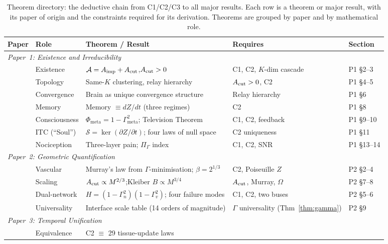 \documentclass[aps,pre,twocolumn,superscriptaddress,floatfix]{revtex4-2}
\begin{document}
\begin{table}[t]
\caption{Theorem directory: the deductive chain from
C1/C2/C3 to all major results.
Each row is a theorem or major result, with its paper
of origin and the constraints required for its derivation.
Theorems are grouped by paper and by mathematical role.}
\label{tab:directory}
\begin{ruledtabular}
\begin{tabular}{lllll}
\textbf{Paper} & \textbf{Role} & \textbf{Theorem / Result}
  & \textbf{Requires} & \textbf{Section} \\
\hline
\multicolumn{5}{l}{\textit{Paper~1: Existence and
Irreducibility}} \\
& Existence &
  $\mathcal{A} = A_{\text{imp}} + A_{\text{cut}}$,\;$A_{\text{cut}} > 0$
  & C1, C2, $K$-dim cascade
  & P1 \S2--3 \\
& Topology &
  Same-$K$ clustering, relay hierarchy
  & $A_{\text{cut}} > 0$, C2
  & P1 \S4--5 \\
& Convergence &
  Brain as unique convergence structure
  & Relay hierarchy
  & P1 \S6 \\
& Memory &
  Memory $\equiv dZ/dt$ (three regimes)
  & C2
  & P1 \S8 \\
& Consciousness &
  $\Phi_{\text{meta}} = 1 - \Gamma_{\text{meta}}^2$;
  Television Theorem
  & C1, C2, feedback
  & P1 \S9--10 \\
& ITC (``Soul'') &
  $\mathcal{S} = \ker(\partial Z/\partial t)$;
  four laws of null space
  & C2 uniqueness
  & P1 \S11 \\
& Nociception &
  Three-layer pain; $\Pi_\Gamma$ index
  & C1, C2, SNR
  & P1 \S13--14 \\
\hline
\multicolumn{5}{l}{\textit{Paper~2: Geometric
Quantification}} \\
& Vascular &
  Murray's law from $\Gamma$-minimisation;
  $\beta = 2^{1/3}$
  & C2, Poiseuille $Z$
  & P2 \S2--4 \\
& Scaling &
  $A_{\text{cut}} \propto M^{2/3}$;\;Kleiber
  $B \propto M^{3/4}$
  & $A_{\text{cut}}$, Murray, $\Omega$
  & P2 \S7--8 \\
& Dual-network &
  $H = (1{-}\Gamma_n^2)(1{-}\Gamma_v^2)$;\;
  four failure modes
  & C1, C2, two buses
  & P2 \S5--6 \\
& Universality &
  Interface scale table (14 orders of magnitude)
  & $\Gamma$ universality (Thm~\ref{thm:gamma})
  & P2 \S9 \\
\hline
\multicolumn{5}{l}{\textit{Paper~3: Temporal
Unification}} \\
& Equivalence &
  C2 $\equiv$ 29 tissue-update laws

\end{tabular}
\end{ruledtabular}
\end{table}
\end{document}
